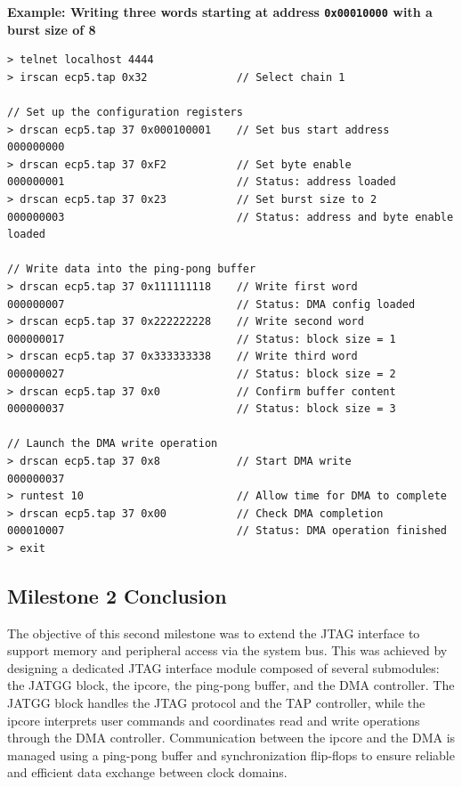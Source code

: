 \documentclass[a4paper,11pt,oneside]{report}
\begin{document}
\vspace{1em}
\noindent\textbf{Example: Writing three words starting at address \texttt{0x00010000} with a burst size of 8}
\begin{lstlisting}
> telnet localhost 4444
> irscan ecp5.tap 0x32              // Select chain 1

// Set up the configuration registers
> drscan ecp5.tap 37 0x000100001    // Set bus start address
000000000
> drscan ecp5.tap 37 0xF2           // Set byte enable
000000001                           // Status: address loaded
> drscan ecp5.tap 37 0x23           // Set burst size to 2
000000003                           // Status: address and byte enable loaded

// Write data into the ping-pong buffer
> drscan ecp5.tap 37 0x111111118    // Write first word
000000007                           // Status: DMA config loaded
> drscan ecp5.tap 37 0x222222228    // Write second word
000000017                           // Status: block size = 1
> drscan ecp5.tap 37 0x333333338    // Write third word
000000027                           // Status: block size = 2
> drscan ecp5.tap 37 0x0            // Confirm buffer content
000000037                           // Status: block size = 3

// Launch the DMA write operation
> drscan ecp5.tap 37 0x8            // Start DMA write
000000037
> runtest 10                        // Allow time for DMA to complete
> drscan ecp5.tap 37 0x00           // Check DMA completion
000010007                           // Status: DMA operation finished
> exit
\end{lstlisting}

\subsection{Milestone 2 Conclusion}

The objective of this second milestone was to extend the JTAG interface to support memory and peripheral access via the system bus.  
This was achieved by designing a dedicated JTAG interface module composed of several submodules: the JATGG block, the ipcore, the ping-pong buffer, and the DMA controller.  
The JATGG block handles the JTAG protocol and the TAP controller, while the ipcore interprets user commands and coordinates read and write operations through the DMA controller.  
Communication between the ipcore and the DMA is managed using a ping-pong buffer and synchronization flip-flops to ensure reliable and efficient data exchange between clock domains.
\end{document}
